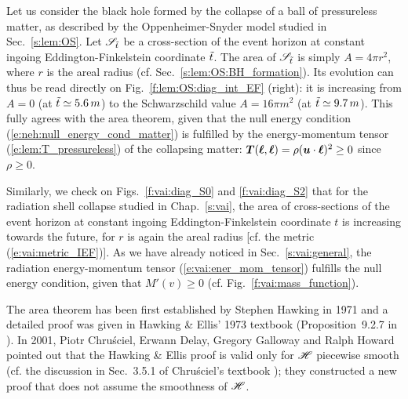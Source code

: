 \begin{example}
Let us consider the black hole formed by the collapse
of a ball of pressureless matter, as described by the Oppenheimer-Snyder
model studied in Sec.~\ref{s:lem:OS}. Let $\mathscr{S}_{{\tilde t}}$ be a
cross-section of the event horizon at constant ingoing Eddington-Finkelstein coordinate ${\tilde t}$.
The area of $\mathscr{S}_{{\tilde t}}$ is simply $A = 4\pi r^2$,
where $r$ is the areal radius (cf. Sec.~\ref{s:lem:OS:BH_formation}). Its
evolution can thus be read directly on Fig.~\ref{f:lem:OS:diag_int_EF} (right):
it is increasing from $A = 0$ (at ${\tilde t}\simeq 5.6\, m$) to the Schwarzschild
value $A = 16\pi m^2$ (at ${\tilde t}\simeq 9.7\, m$). This fully agrees
with the area theorem, given that the null energy condition (\ref{e:neh:null_energy_cond_matter})
is fulfilled by the energy-momentum tensor (\ref{e:lem:T_pressureless}) of the collapsing matter: $\bm{T}(\bm{\ell},\bm{\ell}) =  \rho (\bm{u}\cdot\bm{\ell})^2 \geq 0$ since $\rho \geq 0$.
\end{example}

\begin{example}
Similarly, we check on Figs.~\ref{f:vai:diag_S0} and \ref{f:vai:diag_S2}
that for the radiation shell collapse studied in Chap.~\ref{s:vai},
the area of cross-sections of the event horizon
at constant ingoing Eddington-Finkelstein coordinate $t$
is increasing towards the future, for $r$ is again the areal radius
[cf. the metric (\ref{e:vai:metric_IEF})]. As we have already noticed in
Sec.~\ref{s:vai:general}, the radiation energy-momentum tensor (\ref{e:vai:ener_mom_tensor})
fulfills the null energy condition, given that $M'(v) \geq 0$ (cf. Fig.~\ref{f:vai:mass_function}).
\end{example}


\begin{hist}
The area theorem has been first established by Stephen Hawking
in 1971 \cite{Hawki71} and a detailed proof was given in
Hawking \& Ellis' 1973 textbook (Proposition~9.2.7 in \cite{HawkiE73}).
In 2001, Piotr Chru\'sciel,
Erwann Delay,
Gregory Galloway and Ralph Howard
\cite{ChrusDGH01} pointed out that the Hawking \& Ellis proof is
valid only for $\mathscr{H}$ piecewise smooth (cf. the
discussion in Sec.~3.5.1 of Chru\'sciel's textbook \cite{Chrus20}); they constructed
a new proof that does not assume the smoothness of $\mathscr{H}$.
\end{hist}

